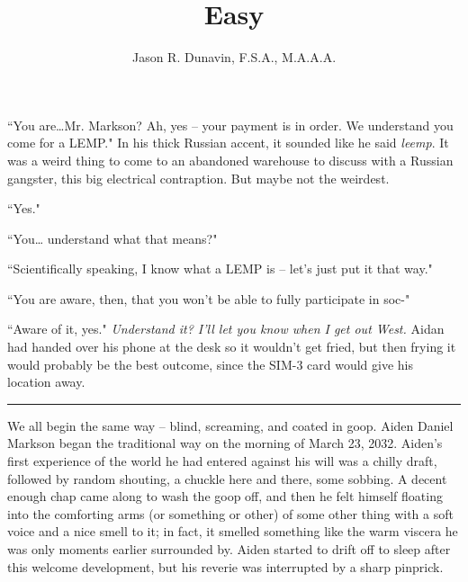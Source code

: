 \documentclass[11pt]{book}
\title{Easy}
\author{Jason R. Dunavin, F.S.A., M.A.A.A.}
\begin{document}
	\maketitle
	
	``You are\dots  Mr. Markson? Ah, yes -- your payment is in order. We understand you come for a LEMP." In his thick Russian accent, it sounded like he said \textit{leemp}. It was a weird thing to come to an abandoned warehouse to discuss with a Russian gangster, this big electrical contraption. But maybe not the weirdest.
	
	``Yes."
	
	``You… understand what that means?"
	
	``Scientifically speaking, I know what a LEMP is – let's just put it that way."
	
	``You are aware, then, that you won't be able to fully participate in soc-"
	
	``Aware of it, yes." \textit{Understand it? I'll let you know when I get out West.} Aidan had handed over his phone at the desk so it wouldn't get fried, but then frying it would probably be the best outcome, since the SIM-3 card would give his location away.
	
	\vspace{0.5cm}
	\hrule
	\vspace{0.5cm}
	
	We all begin the same way – blind, screaming, and coated in goop. Aiden Daniel Markson began the traditional way on the morning of March 23, 2032. Aiden's first experience of the world he had entered against his will was a chilly draft, followed by random shouting, a chuckle here and there, some sobbing. A decent enough chap came along to wash the goop off, and then he felt himself floating into the comforting arms (or something or other) of some other thing with a  soft voice and a nice smell to it; in fact, it smelled something like the warm viscera he was only moments earlier surrounded by. Aiden started to drift off to sleep after this welcome development, but his reverie was interrupted by a sharp pinprick.
	
\end{document}
